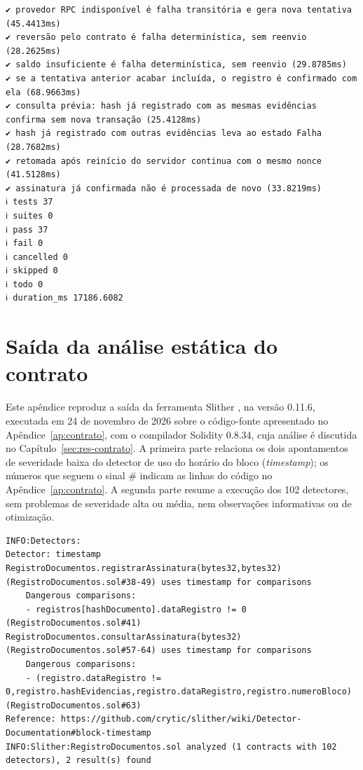 \documentclass[
    12pt,
    a4paper,
    oneside,
    chapter=TITLE,
    section=TITLE,
    subsection=TITLE,
    subsubsection=TITLE,
    sumario=tradicional,
    english,
    brazil
]{abntex2}
\begin{document}
\begin{apendicesenv}
\begin{lstlisting}[style=saida]
✔ provedor RPC indisponível é falha transitória e gera nova tentativa (45.4413ms)
✔ reversão pelo contrato é falha determinística, sem reenvio (28.2625ms)
✔ saldo insuficiente é falha determinística, sem reenvio (29.8785ms)
✔ se a tentativa anterior acabar incluída, o registro é confirmado com ela (68.9663ms)
✔ consulta prévia: hash já registrado com as mesmas evidências confirma sem nova transação (25.4128ms)
✔ hash já registrado com outras evidências leva ao estado Falha (28.7682ms)
✔ retomada após reinício do servidor continua com o mesmo nonce (41.5128ms)
✔ assinatura já confirmada não é processada de novo (33.8219ms)
ℹ tests 37
ℹ suites 0
ℹ pass 37
ℹ fail 0
ℹ cancelled 0
ℹ skipped 0
ℹ todo 0
ℹ duration_ms 17186.6082
\end{lstlisting}

\chapter{Saída da análise estática do contrato}
\label{ap:slither}

Este apêndice reproduz a saída da ferramenta Slither \cite{feist2019}, na versão 0.11.6, executada em 24 de novembro de 2026 sobre o código-fonte apresentado no Apêndice~\ref{ap:contrato}, com o compilador Solidity 0.8.34, cuja análise é discutida no Capítulo~\ref{sec:res-contrato}. A primeira parte relaciona os dois apontamentos de severidade baixa do detector de uso do horário do bloco (\emph{timestamp}); os números que seguem o sinal \# indicam as linhas do código no Apêndice~\ref{ap:contrato}. A segunda parte resume a execução dos 102 detectores, sem problemas de severidade alta ou média, nem observações informativas ou de otimização.

\begin{lstlisting}[style=saida]
INFO:Detectors:
Detector: timestamp
RegistroDocumentos.registrarAssinatura(bytes32,bytes32) (RegistroDocumentos.sol#38-49) uses timestamp for comparisons
    Dangerous comparisons:
    - registros[hashDocumento].dataRegistro != 0 (RegistroDocumentos.sol#41)
RegistroDocumentos.consultarAssinatura(bytes32) (RegistroDocumentos.sol#57-64) uses timestamp for comparisons
    Dangerous comparisons:
    - (registro.dataRegistro != 0,registro.hashEvidencias,registro.dataRegistro,registro.numeroBloco) (RegistroDocumentos.sol#63)
Reference: https://github.com/crytic/slither/wiki/Detector-Documentation#block-timestamp
INFO:Slither:RegistroDocumentos.sol analyzed (1 contracts with 102 detectors), 2 result(s) found


\end{lstlisting}
\end{apendicesenv}
\end{document}
